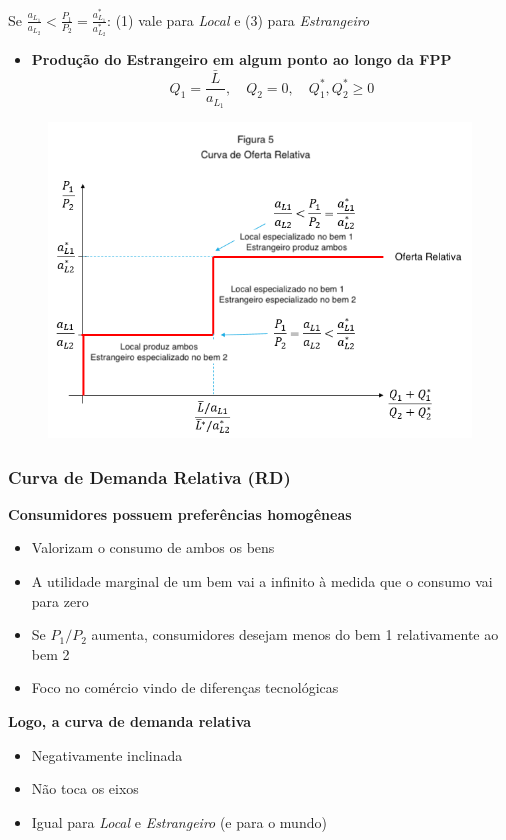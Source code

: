 \documentclass[a4paper,12pt]{article}[abntex2]
\begin{document}
Se \(\frac{a_{L_1}}{a_{L_2}} < \frac{P_1}{P_2} = \frac{a^*_{L_1}}{a^*_{L_2}}\): (1) vale para \textit{Local} e (3) para \textit{Estrangeiro} \begin{itemize}
    \item \textbf{Produção do Estrangeiro em algum ponto ao longo da FPP}
    \[
    Q_1 = \frac{\bar{L}}{a_{L_1}}, \quad Q_2 = 0, \quad Q_1^*, Q_2^* \geq 0
    \]
\end{itemize}

\begin{figure}[H]
    \centering
    \includegraphics[width=0.7\linewidth]{Imagens/a8i4.png}
\end{figure}

\subsubsection{\textbf{Curva de Demanda Relativa (RD)}}

\textbf{Consumidores possuem preferências homogêneas} \begin{itemize}
    \item Valorizam o consumo de ambos os bens
    \item A utilidade marginal de um bem vai a infinito à medida que o consumo vai para zero
    \item Se \( P_1 / P_2 \) aumenta, consumidores desejam menos do bem 1 relativamente ao bem 2
    \item Foco no comércio vindo de diferenças tecnológicas
\end{itemize}

\textbf{Logo, a curva de demanda relativa} \begin{itemize}
    \item Negativamente inclinada
    \item Não toca os eixos
    \item Igual para \textit{Local} e \textit{Estrangeiro} (e para o mundo)
\end{itemize}
\end{document}
